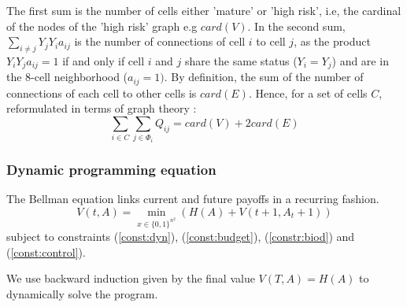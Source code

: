 The first sum is the number of cells either 'mature' or 'high risk', i.e, the cardinal of the nodes of the 'high risk' graph e.g $card(V)$. In the second sum, $\sum_{i \neq j} Y_j Y_i a_{ij}$ is the number of connections of cell $i$ to cell $j$, as the product $Y_i Y_j a_{ij}=1$ if and only if cell $i$ and $j$ share the same status ($Y_i = Y_j$) and are in the 8-cell neighborhood ($a_{ij}=1)$. By definition, the sum of the number of connections of each cell to other cells is $card(E)$. Hence, for a set of cells $C$, reformulated in terms of graph theory : 
\begin{equation}
        \sum_{i \in C}\sum_{j \in \Phi_i}Q_{ij} = card(V) + 2 card(E)
\end{equation}

\subsubsection{Dynamic programming equation}

The Bellman equation links current and future payoffs in a recurring fashion.
\begin{equation}
    V(t,A)= \min_{x\in\{0,1\}^{n^2}} \left(H(A) + V(t+1, A_t+1)\right)
\end{equation}
subject to constraints (\ref{const:dyn}), (\ref{const:budget}), (\ref{constr:biod}) and (\ref{const:control}). 

We use backward induction given by the final value $ V(T, A) = H(A)$ to dynamically solve the program. 



